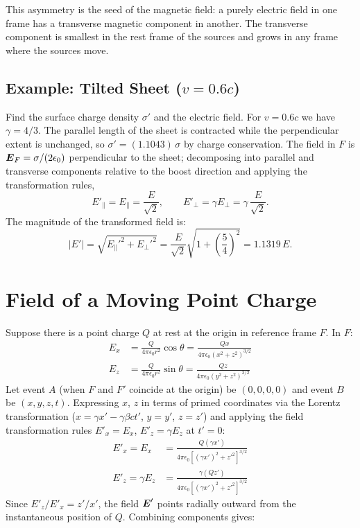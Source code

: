 This asymmetry is the seed of the magnetic field: a purely electric field in one frame has a transverse magnetic component in another. The transverse component is smallest in the rest frame of the sources and grows in any frame where the sources move.

\subsection*{Example: Tilted Sheet ($v = 0.6c$)}

Find the surface charge density $\sigma'$ and the electric field. For $v = 0.6c$ we have $\gamma = 4/3$. The parallel length of the sheet is contracted while the perpendicular extent is unchanged, so $\sigma' = (1.1043)\,\sigma$ by charge conservation. The field in $F$ is $\vect{E}_F = \sigma/(2\epsilon_0)$ perpendicular to the sheet; decomposing into parallel and transverse components relative to the boost direction and applying the transformation rules,
\[
  E'_{\parallel} = E_{\parallel} = \frac{E}{\sqrt{2}},
  \qquad
  E'_{\perp} = \gamma E_{\perp} = \gamma\,\frac{E}{\sqrt{2}}.
\]
The magnitude of the transformed field is:
\[
  |E'| = \sqrt{E_\parallel'^2 + E_\perp'^2} = \frac{E}{\sqrt{2}}\sqrt{1 + \left(\frac{5}{4}\right)^2} = 1.1319\,E.
\]

\section{Field of a Moving Point Charge}

Suppose there is a point charge $Q$ at rest at the origin in reference frame $F$. In $F$:
\begin{align*}
  E_x &= \frac{Q}{4\pi\epsilon_0 r^2}\cos\theta = \frac{Qx}{4\pi\epsilon_0(x^2+z^2)^{3/2}} \\
  E_z &= \frac{Q}{4\pi\epsilon_0 r^2}\sin\theta = \frac{Qz}{4\pi\epsilon_0(y^2+z^2)^{3/2}}
\end{align*}
Let event $A$ (when $F$ and $F'$ coincide at the origin) be $(0,0,0,0)$ and event $B$ be $(x,y,z,t)$. Expressing $x$, $z$ in terms of primed coordinates via the Lorentz transformation ($x = \gamma x' - \gamma\beta ct'$, $y = y'$, $z = z'$) and applying the field transformation rules $E'_x = E_x$, $E'_z = \gamma E_z$ at $t'=0$:
\begin{align*}
  E'_x = E_x &= \frac{Q(\gamma x')}{4\pi\epsilon_0\left[(\gamma x')^2 + z'^2\right]^{3/2}} \\
  E'_z = \gamma E_z &= \frac{\gamma(Qz')}{4\pi\epsilon_0\left[(\gamma x')^2 + z'^2\right]^{3/2}}
\end{align*}
Since $E'_z/E'_x = z'/x'$, the field $\vect{E}'$ points radially outward from the instantaneous position of $Q$. Combining components gives:

